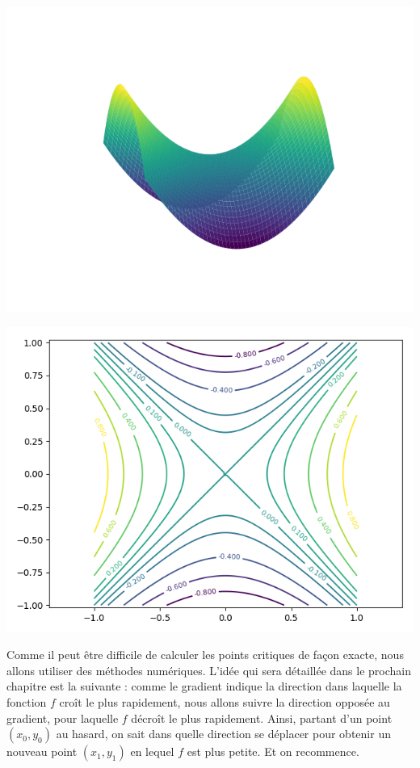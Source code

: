 \begin{exemple}{}{}
\begin{center}
		\includegraphics[scale=\myscale,scale=0.5]{figures/gradient-surface-3c}
	\end{center}
	\begin{center}
		\includegraphics[scale=\myscale,scale=0.7]{figures/gradient-surface-4}
	\end{center}
	
	
\end{exemple}


Comme il peut être difficile de calculer les points critiques de façon exacte, nous allons utiliser des méthodes numériques.
L'idée qui sera détaillée dans le prochain chapitre est la suivante : comme le gradient indique la direction dans laquelle la fonction $f$ croît le plus rapidement, nous allons suivre la direction opposée au gradient, pour laquelle $f$ décroît le plus rapidement. Ainsi, partant d'un point $(x_0,y_0)$ au hasard, on sait dans quelle direction se déplacer pour obtenir un nouveau point $(x_1,y_1)$ en lequel $f$ est plus petite. Et on recommence.

